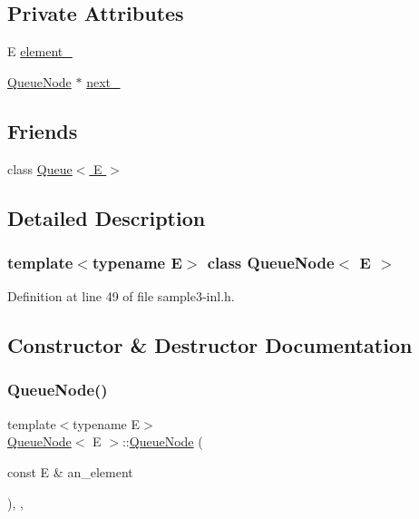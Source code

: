 \subsection*{Private Attributes}
\begin{DoxyCompactItemize}
\item 
E \hyperlink{classQueueNode_a593f0f5862848c1e9063d32ea3438b58}{element\+\_\+}
\item 
\hyperlink{classQueueNode}{Queue\+Node} $\ast$ \hyperlink{classQueueNode_a7434603f6c25418f7810f041752876bd}{next\+\_\+}
\end{DoxyCompactItemize}
\subsection*{Friends}
\begin{DoxyCompactItemize}
\item 
class \hyperlink{classQueueNode_ad4336229b1d7c3626e4ba69f236b202d}{Queue$<$ E $>$}
\end{DoxyCompactItemize}


\subsection{Detailed Description}
\subsubsection*{template$<$typename E$>$\newline
class Queue\+Node$<$ E $>$}



Definition at line 49 of file sample3-\/inl.\+h.



\subsection{Constructor \& Destructor Documentation}
\mbox{\label{classQueueNode_a2c22feef35d910bec7138598e8784e25}} 
\subsubsection{\texorpdfstring{Queue\+Node()}{QueueNode()}\hspace{0.1cm}{\footnotesize\ttfamily [1/2]}}
{\footnotesize\ttfamily template$<$typename E$>$ \\
\hyperlink{classQueueNode}{Queue\+Node}$<$ E $>$\+::\hyperlink{classQueueNode}{Queue\+Node} (\begin{DoxyParamCaption}\item[{const E \&}]{an\+\_\+element }\end{DoxyParamCaption})\hspace{0.3cm}{\ttfamily [inline]}, {\ttfamily [explicit]}, {\ttfamily [private]}}



